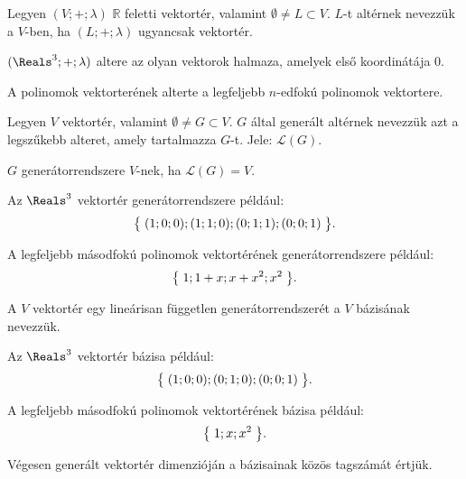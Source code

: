 \documentclass[a4paper, 12pt]{scrartcl}
\begin{document}
\begin{definition}[Altér]
  Legyen $(V; +; \lambda)$ $\mathbb R$ feletti vektortér, valamint
  $\emptyset \neq L \subset V$. $L$-t altérnek nevezzük a $V$-ben, ha
  $(L; +; \lambda)$ ugyancsak vektortér.
\end{definition}

\begin{example}
  $(\Reals^3; +; \lambda)$ altere az olyan vektorok halmaza, amelyek első
  koordinátája $0$.

  A polinomok vektorterének alterte a legfeljebb $n$-edfokú polinomok
  vektortere.
\end{example}

\begin{definition}[Generátorrendszer]
  Legyen $V$ vektortér, valamint $\emptyset \neq G \subset V$. $G$ által
  generált altérnek nevezzük azt a legszűkebb alteret, amely tartalmazza $G$-t.
  Jele: $\mathcal L(G)$.

  $G$ generátorrendszere $V$-nek, ha $\mathcal L(G) = V$.
\end{definition}

\begin{example}
  Az $\Reals^3$ vektortér generátorrendszere például:
  $$
    \big\{\;
    (1; 0; 0);
    (1; 1; 0);
    (0; 1; 1);
    (0; 0; 1)
    \;\big\}
    \text.
  $$

  A legfeljebb másodfokú polinomok vektortérének generátorrendszere például:
  $$
    \big\{\;
    1;
    1 + x;
    x + x^2;
    x^2
    \;\big\}
    \text.
  $$
\end{example}

\begin{definition}[Bázis]
  A $V$ vektortér egy lineárisan független generátorrendszerét a $V$
  bázisának nevezzük.
\end{definition}

\begin{example}
  Az $\Reals^3$ vektortér bázisa például:
  $$
    \big\{\;
    (1; 0; 0);
    (0; 1; 0);
    (0; 0; 1)
    \;\big\}
    \text.
  $$

  A legfeljebb másodfokú polinomok vektortérének bázisa például:
  $$
    \big\{\;
    1;
    x;
    x^2
    \;\big\}
    \text.
  $$
\end{example}

\begin{definition}
  Végesen generált vektortér dimenzióján a bázisainak közös tagszámát értjük.
\end{definition}
\end{document}
